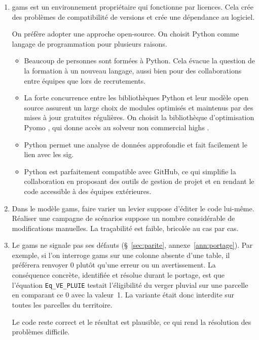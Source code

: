 \begin{enumerate}[leftmargin=1.6em,itemsep=6pt]

\item \gls{gams} est un environnement propriétaire qui fonctionne par licences. Cela crée des
problèmes de compatibilité de versions et crée une dépendance au logiciel.

On préfère adopter une approche open-source. On choisit Python comme langage de programmation
pour plusieurs raisons.

\begin{itemize}[leftmargin=1.2em,itemsep=3pt]
  \item Beaucoup de personnes sont formées à Python. Cela évacue la question de la formation à un
    nouveau langage, aussi bien pour des collaborations entre équipes que lors de recrutements.
  \item La forte concurrence entre les bibliothèques Python et leur modèle open source assurent
    un large choix de modules optimisés et maintenus par des mises à jour gratuites régulières.
    On choisit la bibliothèque d'optimisation Pyomo \parencite{pyomo2021}, qui donne accès au
    solveur non commercial \gls{highs} \parencite{highs2018}.
  \item Python permet une analyse de données approfondie et fait facilement le lien avec les
    \gls{sig}.
  \item Python est parfaitement compatible avec GitHub, ce qui simplifie la collaboration en
    proposant des outils de gestion de projet et en rendant le code accessible à des équipes
    extérieures.
\end{itemize}

\item Dans le modèle \gls{gams}, faire varier un levier suppose d'éditer le code lui-même.
Réaliser une campagne de scénarios suppose un nombre considérable de modifications manuelles. La
traçabilité est faible, bricolée au cas par cas.

\item Le \gls{gams} ne signale pas ses défauts (§~\ref{sec:parite},
annexe~\ref{ann:portage}). Par exemple, si l'on interroge \gls{gams} sur une colonne absente
d'une table, il préférera renvoyer \num{0} plutôt qu'une erreur ou un avertissement. La
conséquence concrète, identifiée et résolue durant le portage, est que l'équation
\texttt{Eq\_VE\_PLUIE} testait l'éligibilité du verger pluvial sur une parcelle en comparant ce
\num{0} avec la valeur~\num{1}. La variante était donc interdite sur toutes les parcelles du
territoire.

Le code reste correct et le résultat est plausible, ce qui rend la résolution des problèmes
difficile.

\end{enumerate}
